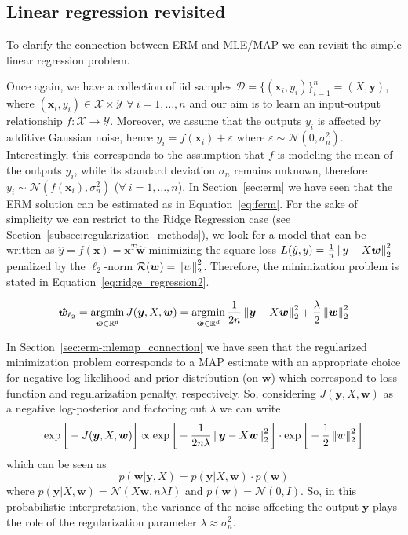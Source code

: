 \subsection{Linear regression revisited} \label{subsec:linear_regression_revisited}

To clarify the connection between ERM and MLE/MAP we can revisit the simple linear regression problem.

Once again, we have a collection of \ac{iid} samples $\mathcal{D}=\{(\bm{x}_i,y_i)\}_{i=1}^n = (X, \bm{y})$, where $(\bm{x}_i,y_i) \in \mathcal{X} \times \mathcal{Y}$ $\forall~i=1,\dots,n$ and our aim is to learn an input-output relationship $f: \mathcal{X} \rightarrow \mathcal{Y}$.
Moreover, we assume that the outputs $y_i$ is affected by additive Gaussian noise, hence $y_i = f(\bm{x}_i) + \varepsilon$ where $\varepsilon \sim \mathcal{N}(0,\sigma_n^2)$.
Interestingly, this corresponds to the assumption that $f$ is modeling the mean of the outputs $y_i$, while its standard deviation $\sigma_n$ remains unknown, therefore $y_i \sim \mathcal{N}(f(\bm{x}_i), \sigma_n^2)$ ($\forall~i=1,\dots,n$).
In Section~\ref{sec:erm} we have seen that the ERM solution can be estimated as in Equation~\ref{eq:ferm}. For the sake of simplicity we can restrict to the Ridge Regression  case (see Section~\ref{subsec:regularization_methods}), \ie we look for a model that can be written as $\hat y = f(\bm{x}) = \bm{x}^T \bm{ \hat w}$ minimizing the square loss $L(\hat y,y) = \frac{1}{n} \left\lVert y - X\bm{w}\right\rVert_2^2$ penalized by the $\ell_2$-norm $\mathcal{R}(\bm{w}) = \left\lVert w\right\rVert_2^2$.
Therefore, the minimization problem is stated in Equation~\eqref{eq:ridge_regression2}.

\begin{equation} \label{eq:ridge_regression2}
	\bm{\hat w}_{\ell_2} = \mathop{\mathrm{argmin}}\limits_{\bm{\hat w} \in \mathbb{R}^d} J(\bm{y}, X, \bm{w}) = \mathop{\mathrm{argmin}}\limits_{\bm{\hat w} \in \mathbb{R}^d}\frac{1}{2n} \left\lVert\bm{y} - X\bm{w}\right\rVert_2^2+\frac{\lambda}{2}\left\lVert\bm{w}\right\rVert_2^2
\end{equation}

In Section~\ref{sec:erm-mlemap_connection} we have seen that the regularized minimization problem corresponds to a MAP estimate with an appropriate choice for negative log-likelihood and prior distribution (on $\bm{w}$) which correspond to loss function and regularization penalty, respectively. So, considering $J(\bm{y}, X, \bm{w})$ as a negative log-posterior and factoring out $\lambda$ we can write
$$
\exp{\bigg[-J(\bm{y}, X, \bm{w})\bigg]} \propto \exp \bigg[ -\frac{1}{2n\lambda} \left\lVert\bm{y}-X\bm{w}\right\rVert_2^2 \bigg] \cdot \exp{\bigg[-\frac{1}{2}\left\lVert w\right\rVert_2^2 \bigg]}
$$
which can be seen as
$$
p(\bm{w}|\bm{y},X) = p(\bm{y}|X,\bm{w}) \cdot p(\bm{w})
$$
where $p(\bm{y}|X,\bm{w}) = \mathcal{N}(X\bm{w},n \lambda I)$ and $p(\bm{w}) = \mathcal{N}(0,I)$. So, in this probabilistic interpretation, the variance of the noise affecting the output $\bm{y}$ plays the role of the regularization parameter $\lambda \approx \sigma_n^2$.


